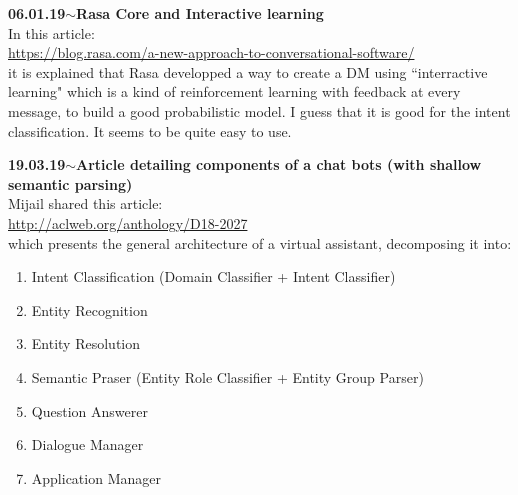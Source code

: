 \documentclass[11pt,a4paper]{article}
\newenvironment{loggentry}[2]%
{\noindent\textbf{#1}\hspace{1cm}$\mathbf{\sim}$\text{ }\textbf{#2}\\}{\vspace{0.5cm}}
\begin{document}
\begin{loggentry}{06.01.19}{Rasa Core and Interactive learning}

In this article:\\
\url{https://blog.rasa.com/a-new-approach-to-conversational-software/}\\
it is explained that Rasa developped a way to create a DM using ``interractive learning" which is a kind of reinforcement learning with feedback at every message, to build a good probabilistic model. I guess that it is good for the intent classification. It seems to be quite easy to use.

\end{loggentry}


\begin{loggentry}{19.03.19}{Article detailing components of a chat bots (with shallow semantic parsing)}

Mijail shared this article:\\
\url{http://aclweb.org/anthology/D18-2027}\\
which presents the general architecture of a virtual assistant, decomposing it into:
\begin{enumerate}
\item Intent Classification (Domain Classifier + Intent Classifier)
\item Entity Recognition
\item Entity Resolution
\item Semantic Praser (Entity Role Classifier + Entity Group Parser)
\item Question Answerer
\item Dialogue Manager
\item Application Manager
\end{enumerate}

\end{loggentry}
\end{document}
